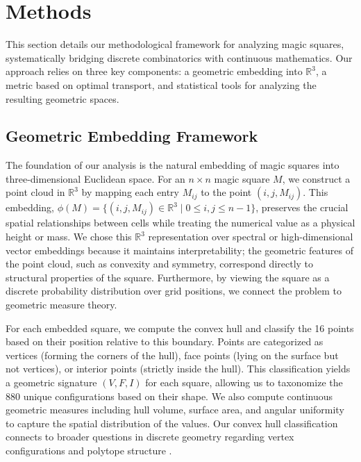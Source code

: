 \section{Methods}\label{sec:methods}

This section details our methodological framework for analyzing magic squares, systematically bridging discrete combinatorics with continuous mathematics. Our approach relies on three key components: a geometric embedding into $\mathbb{R}^3$, a metric based on optimal transport, and statistical tools for analyzing the resulting geometric spaces.

\subsection{Geometric Embedding Framework}

The foundation of our analysis is the natural embedding of magic squares into three-dimensional Euclidean space. For an $n \times n$ magic square $M$, we construct a point cloud in $\mathbb{R}^3$ by mapping each entry $M_{ij}$ to the point $(i, j, M_{ij})$. This embedding, $\phi(M) = \{(i, j, M_{ij}) \in \mathbb{R}^3 \mid 0 \leq i, j \leq n-1\}$, preserves the crucial spatial relationships between cells while treating the numerical value as a physical height or mass. We chose this $\mathbb{R}^3$ representation over spectral or high-dimensional vector embeddings because it maintains interpretability; the geometric features of the point cloud, such as convexity and symmetry, correspond directly to structural properties of the square. Furthermore, by viewing the square as a discrete probability distribution over grid positions, we connect the problem to geometric measure theory.

For each embedded square, we compute the convex hull and classify the 16 points based on their position relative to this boundary. Points are categorized as vertices (forming the corners of the hull), face points (lying on the surface but not vertices), or interior points (strictly inside the hull). This classification yields a geometric signature $(V, F, I)$ for each square, allowing us to taxonomize the 880 unique configurations based on their shape. We also compute continuous geometric measures including hull volume, surface area, and angular uniformity to capture the spatial distribution of the values. Our convex hull classification connects to broader questions in discrete geometry regarding vertex configurations and polytope structure \citep{ziegler1995lectures}.

